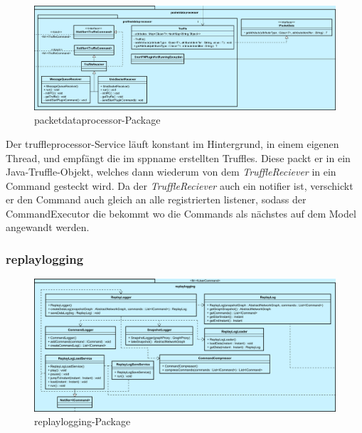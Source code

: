     \begin{figure}[H]
      \centering
      \includegraphics[width=\textwidth]{../diagramimages/packetdataprocessor.png}
      \caption{packetdataprocessor-Package}
    \end{figure}

    \medskip
    Der truffleprocessor-Service läuft konstant im Hintergrund, in einem eigenen Thread,
    und empfängt die im \gls{sppname} erstellten Truffles.
    Diese packt er in ein Java-Truffle-Objekt, welches dann wiederum von dem
    \textit{TruffleReciever} in ein Command gesteckt wird. Da der \textit{TruffleReciever}
    auch ein \gls{notifier} ist, verschickt er den Command auch gleich an
    alle registrierten \gls{listener}, sodass der CommandExecutor die bekommt wo die Commands
    als nächstes auf dem Model angewandt werden.

    \subsubsection{replaylogging}
    \label{subsubsec:replaylogging}

    \begin{figure}[H]
      \centering
      \includegraphics[width=\textwidth]{../diagramimages/replaylogging.png}
      \caption{replaylogging-Package}
    \end{figure}

